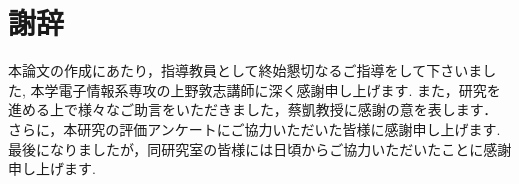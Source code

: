 \documentclass[\homedir/main.tex]{subfiles}
\begin{document}
\chapter*{謝辞}\label{chap:acknowledgment}
本論文の作成にあたり，指導教員として終始懇切なるご指導をして下さいました,
本学電子情報系専攻の上野敦志講師に深く感謝申し上げます.
また，研究を進める上で様々なご助言をいただきました，蔡凱教授に感謝の意を表します．
さらに，本研究の評価アンケートにご協力いただいた皆様に感謝申し上げます.
最後になりましたが，同研究室の皆様には日頃からご協力いただいたことに感謝申し上げます.
\end{document}
